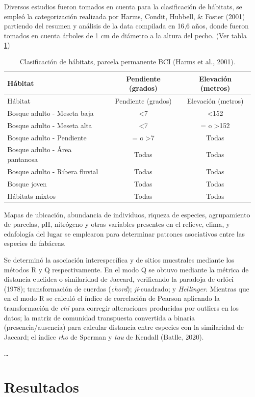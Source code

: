 \documentclass[11pt,]{article}
\begin{document}
Diversos estudios fueron tomados en cuenta para la clasificación de
hábitats, se empleó la categorización realizada por Harms, Condit,
Hubbell, \& Foster (2001) partiendo del resumen y análisis de la data
compilada en 16,6 años, donde fueron tomados en cuenta árboles de 1 cm
de diámetro a la altura del pecho. (Ver tabla \ref{tab:hábitat})

\begin{longtable}[]{@{}lcc@{}}
\caption{Clasificación de hábitats, parcela permanente BCI (Harms et
al., 2001).\label{tab:hábitat}}\tabularnewline
\toprule
Hábitat & Pendiente (grados) & Elevación (metros)\tabularnewline
\midrule
\endfirsthead
\toprule
Hábitat & Pendiente (grados) & Elevación (metros)\tabularnewline
\midrule
\endhead
Bosque adulto - Meseta baja & \textless{}7 &
\textless{}152\tabularnewline
Bosque adulto - Meseta alta & \textless{}7 & = o
\textgreater{}152\tabularnewline
Bosque adulto - Pendiente & = o \textgreater{}7 & Todas\tabularnewline
Bosque adulto - Área pantanosa & Todas & Todas\tabularnewline
Bosque adulto - Ribera fluvial & Todas & Todas\tabularnewline
Bosque joven & Todas & Todas\tabularnewline
Hábitats mixtos & Todas & Todas\tabularnewline
\bottomrule
\end{longtable}

Mapas de ubicación, abundancia de individuos, riqueza de especies,
agrupamiento de parcelas, pH, nitrógeno y otras variables presentes en
el relieve, clima, y edafología del lugar se emplearon para determinar
patrones asociativos entre las especies de fabáceas.

Se determinó la asociación interespecífica y de sitios muestrales
mediante los métodos R y Q respectivamente. En el modo Q se obtuvo
mediante la métrica de distancia euclidea o similaridad de Jaccard,
verificando la paradoja de orlóci (1978); transformación de cuerdas
(\emph{chord}); \emph{ji}-cuadrado; y \emph{Hellinger}. Mientras que en
el modo R se calculó el índice de correlación de Pearson aplicando la
transformación de \emph{chi} para corregir alteraciones producidas por
outliers en los datos; la matriz de comunidad transpuesta convertida a
binaria (presencia/ausencia) para calcular distancia entre especies con
la similaridad de Jaccard; el índice \emph{rho} de Sperman y \emph{tau}
de Kendall (Batlle, 2020).

\ldots

\section{Resultados}\label{resultados}
\end{document}
